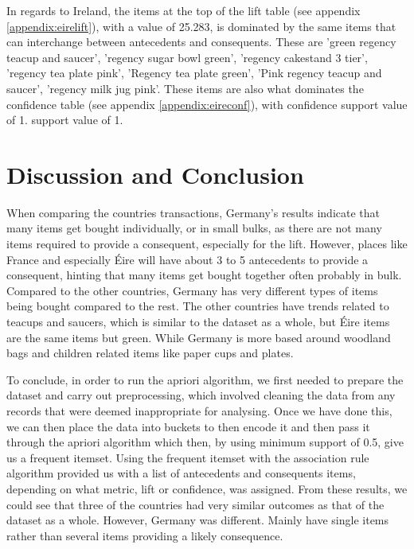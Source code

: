 \documentclass[a4paper,10pt]{article}
\begin{document}
In regards to Ireland, the items at the top of the lift table (see appendix \ref{appendix:eirelift}), with a value of 25.283, is dominated by the same items that can interchange between antecedents and consequents. These are 'green regency teacup and saucer', 'regency sugar bowl green', 'regency cakestand 3 tier', 'regency tea plate pink', 'Regency tea plate green', 'Pink regency teacup and saucer', 'regency milk jug pink'.  These items are also what dominates the confidence table (see appendix \ref{appendix:eireconf}), with confidence support value of 1. support value of 1.

\section{Discussion and Conclusion}

When comparing the countries transactions, Germany's results indicate that many items get bought individually, or in small bulks, as there are not many items required to provide a consequent, especially for the lift. However, places like France and especially Éire will have about 3 to 5 antecedents to provide a consequent, hinting that many items get bought together often probably in bulk. Compared to the other countries, Germany has very different types of items being bought compared to the rest. The other countries have trends related to teacups and saucers, which is similar to the dataset as a whole, but Éire items are the same items but green. While Germany is more based around woodland bags and children related items like paper cups and plates.

To conclude, in order to run the apriori algorithm, we first needed to prepare the dataset and carry out preprocessing, which involved cleaning the data from any records that were deemed inappropriate for analysing. Once we have done this, we can then place the data into buckets to then encode it and then pass it through the apriori algorithm which then, by using minimum support of 0.5, give us a frequent itemset. Using the frequent itemset with the association rule algorithm provided us with a list of antecedents and consequents items, depending on what metric, lift or confidence, was assigned. From these results, we could see that three of the countries had very similar outcomes as that of the dataset as a whole. However, Germany was different. Mainly have single items rather than several items providing a likely consequence.
\end{document}
